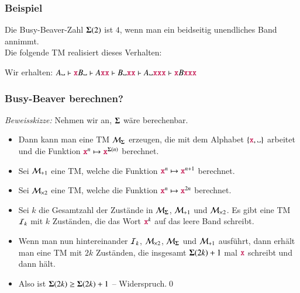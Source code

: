 \documentclass[onlymath]{beamer}
\begin{document}
\begin{frame}\frametitle{Beispiel}

Die Busy-Beaver-Zahl $\boldsymbol{\Sigma}(2)$ ist $4$, wenn man ein beidseitig unendliches Band annimmt.\\
Die folgende TM realisiert dieses Verhalten:

\begin{center}
\end{center}

Wir erhalten: $A\blank\vdash \Sterm{x}B\blank\vdash A\Sterm{xx}\vdash B\blank\Sterm{xx}\vdash A\blank\Sterm{xxx}\vdash \Sterm{x}B\Sterm{xxx}$

\end{frame}

\begin{frame}\frametitle{Busy-Beaver berechnen?}



\pause
\emph{Beweisskizze:} Nehmen wir an, $\boldsymbol{\Sigma}$ wäre berechenbar.\pause
\begin{itemize}
\item Dann kann man eine TM $\mathcal{M}_{\boldsymbol{\Sigma}}$ erzeugen, die mit dem Alphabet $\{\Sterm{x},\blank\}$ arbeitet und die Funktion $\mathtt{\textcolor{purple}{x}}^n\mapsto\mathtt{\textcolor{purple}{x}}^{\boldsymbol{\Sigma}(n)}$ berechnet.\pause
\item Sei $\mathcal{M}_{+1}$ eine TM, welche die Funktion $\mathtt{\textcolor{purple}{x}}^n\mapsto\mathtt{\textcolor{purple}{x}}^{n+1}$ berechnet.\pause
\item Sei $\mathcal{M}_{\times2}$ eine TM, welche die Funktion $\mathtt{\textcolor{purple}{x}}^n\mapsto\mathtt{\textcolor{purple}{x}}^{2n}$ berechnet.\pause
\item Sei $k$ die Gesamtzahl der Zustände in $\mathcal{M}_{\boldsymbol{\Sigma}}$, $\mathcal{M}_{+1}$ und $\mathcal{M}_{\times2}$. Es gibt eine TM $\mathcal{I}_k$ mit $k$ Zuständen, die das Wort $\mathtt{\textcolor{purple}{x}}^k$ auf das leere Band schreibt.\pause
\item Wenn man nun hintereinander $\mathcal{I}_k$, $\mathcal{M}_{\times2}$, $\mathcal{M}_{\boldsymbol{\Sigma}}$ und $\mathcal{M}_{+1}$ ausführt, dann erhält man eine TM mit $2k$ Zuständen, die insgesamt $\boldsymbol{\Sigma}(2k)+1$ mal $\mathtt{\textcolor{purple}{x}}$ schreibt und dann hält.\pause
\item Also ist $\boldsymbol{\Sigma}(2k)\geq\boldsymbol{\Sigma}(2k)+1$ -- Widerspruch.\qed
\end{itemize}


\end{frame}
\end{document}
